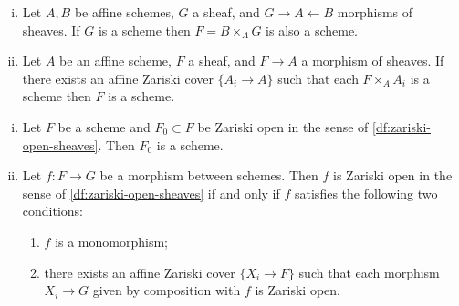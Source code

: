 
        \begin{lemma}\label{le:recollement-and-affine}
            \mbox{}\vspace{-1em}
            \begin{enumerate}[(i)]
                \item Let $A,B$ be affine schemes, $G$ a sheaf, and $G\to A\leftarrow B$ morphisms of sheaves.
                    If $G$ is a scheme then $F=B\times_A G$ is also a scheme.
                \item Let $A$ be an affine scheme, $F$ a sheaf, and $F\to A$ a morphism of sheaves.
                    If there exists an affine Zariski cover $\{A_i\to A\}$ such that each $F\times_A A_i$ is a scheme then $F$ is a scheme.\qedhere
            \end{enumerate}
        \end{lemma}









        \clearpage






        \begin{lemma}
            \mbox{}\vspace{-1em}
            \begin{enumerate}[(i)]
                \item Let $F$ be a scheme and $F_0\subset F$ be Zariski open in the sense of \cref{df:zariski-open-sheaves}.
                    Then $F_0$ is a scheme.
                \item Let $f\colon F\to G$ be a morphism between schemes.
                    Then $f$ is Zariski open in the sense of \cref{df:zariski-open-sheaves} if and only if $f$ satisfies the following two conditions:
                    \begin{enumerate}
                        \item $f$ is a monomorphism;
                        \item there exists an affine Zariski cover $\{X_i\to F\}$ such that each morphism $X_i\to G$ given by composition with $f$ is Zariski open.\qedhere
                    \end{enumerate}
            \end{enumerate}
        \end{lemma}

